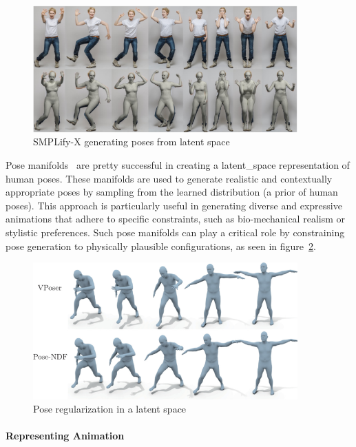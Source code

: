 \documentclass[../../main.tex]{subfiles}
\begin{document}
\begin{figure}
  \centering \includegraphics[width = 4in]{chapters/background_work/images/simplifyx.png}
  \caption{SMPLify-X generating poses from latent space}
  \label{fig:simplifyx}
\end{figure}

Pose manifolds~\cite{pavlakos2019expressive,tiwari2022pose, lu2023dposer} are pretty successful in creating a \gls{latent_space} representation of human poses. These manifolds are used to generate realistic and contextually appropriate poses by sampling from the learned distribution (a prior of human poses). This approach is particularly useful in generating diverse and expressive animations that adhere to specific constraints, such as bio-mechanical realism or stylistic preferences. Such pose manifolds can play a critical role by constraining pose generation to physically plausible configurations, as seen in figure~\ref{fig:pose_manifolds}.

\begin{figure}
  \centering \includegraphics[width = 4in]{chapters/background_work/images/pose_manifolds.png}
  \caption{Pose regularization in a latent space}
  \label{fig:pose_manifolds}
\end{figure}

\paragraph{Representing Animation}
\label{ch:background_work:sign_language_synthesis:3d_techniques:avatar_animation:animation_timeline}
\end{document}
